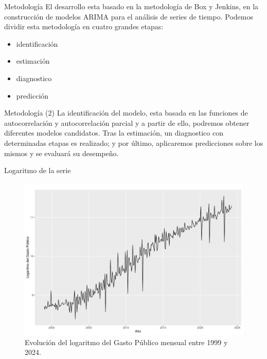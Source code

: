 \documentclass[
  ignorenonframetext,
]{beamer}
\begin{document}
\begin{frame}{Metodología}
\protect\hypertarget{metodologia}{}
El desarrollo esta basado en la metodología de Box y Jenkins, en la
construcción de modelos ARIMA para el análisis de series de tiempo.
Podemos dividir esta metodología en cuatro grandes etapas:

\begin{itemize}
\item
  identificación
\item
  estimación
\item
  diagnostico
\item
  predicción
\end{itemize}
\end{frame}

\begin{frame}{Metodología (2)}
\protect\hypertarget{metodologuxeda-2}{}
La identificación del modelo, esta basada en las funciones de
autocorrelación y autocorrelación parcial y a partir de ello, podremos
obtener diferentes modelos candidatos. Tras la estimación, un
diagnostico con determinadas etapas es realizado; y por último,
aplicaremos predicciones sobre los mismos y se evaluará su desempeño.
\end{frame}

\begin{frame}{Logaritmo de la serie}
\protect\hypertarget{logaritmo-de-la-serie}{}
\begin{figure}[H]

{\centering \includegraphics[width=0.85\linewidth]{presentacion_files/figure-beamer/log_plot-1} 

}

\caption{\label{log_plot} Evolución del logaritmo del Gasto Público mensual entre 1999 y 2024.}\label{fig:log_plot}
\end{figure}
\end{frame}
\end{document}
